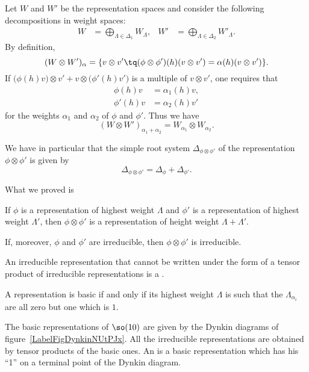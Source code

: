 Let $W$ and $W'$ be the representation spaces and consider the following decompositions in weight spaces:
\begin{align}
    W&=\bigoplus_{\Lambda\in\Delta_1}W_{\Lambda},&      W'&=\bigoplus_{\Lambda\in\Delta_2}W'_{\Lambda}.
\end{align}
By definition,
\begin{equation}
    (W\otimes W')_{\alpha}=\{ v\otimes v'\tq (\phi\otimes\phi')(h)(v\otimes v')=\alpha(h)(v\otimes v') \}.
\end{equation}
If $\big( \phi(h)v \big)\otimes v'+v\otimes\big( \phi'(h)v' \big)$ is a multiple of $v\otimes v'$, one requires that
\begin{subequations}
    \begin{align}
        \phi(h)v    &=\alpha_1(h)v,\\
        \phi'(h)v   &=\alpha_2(h)v'
    \end{align}
\end{subequations}
for the weights $\alpha_1$ and $\alpha_2$ of $\phi$ and $\phi'$. Thus we have
\begin{equation}
    (W\otimes W')_{\alpha_1+\alpha_2}=W_{\alpha_1}\otimes W_{\alpha_2}.
\end{equation}

We have in particular that the simple root system $\Delta_{\phi\otimes\phi'}$ of the representation $\phi\otimes\phi'$ is given by
\begin{equation}        \label{EqDeldelDElphitens}
    \Delta_{\phi\otimes\phi'}= \Delta_{\phi}+\Delta_{\phi'}.
\end{equation}

What we proved is
\begin{proposition} \label{Propphihwrepplullllam}
    If $\phi$ is a representation of highest weight $\Lambda$ and $\phi'$ is a representation of highest weight $\Lambda'$, then $\phi\otimes\phi'$ is a representation of height weight $\Lambda+\Lambda'$.

    If, moreover, $\phi$ and $\phi'$ are irreducible, then $\phi\otimes\phi'$ is irreducible.
\end{proposition}

An irreducible representation that cannot be written under the form of a tensor product of irreducible representations is a .

\begin{lemma}
    A representation is basic if and only if its highest weight $\Lambda$ is such that the $\Lambda_{\alpha_i}$ are all zero but one which is $1$.
\end{lemma}
The basic representations of $\so(10)$ are given by the Dynkin diagrams of figure~\ref{LabelFigDynkinNUtPJx}. All the irreducible representations are obtained by tensor products of the basic ones. An  is a basic representation which has his ``1'' on a terminal point of the Dynkin diagram.
\newcommand{\CaptionFigDynkinNUtPJx}{Basic representations of $\so(10)$}


